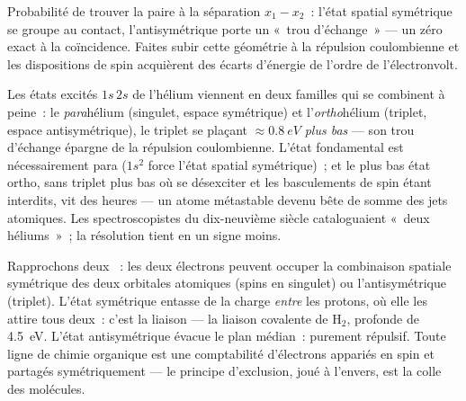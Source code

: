 \begin{omfigure}

{\small Probabilité de trouver la paire à la séparation $x_1 - x_2$~:
l'état spatial symétrique se groupe au contact, l'antisymétrique porte
un «~trou d'échange~» --- un zéro exact à la coïncidence. Faites
subir cette géométrie à la répulsion coulombienne et les dispositions
de spin acquièrent des écarts d'énergie de l'ordre de l'électronvolt.}
\end{omfigure}

\begin{example}\label{ex:b3:identical-particles:helium}
Les états excités $1s\,2s$ de l'hélium viennent en deux familles qui
se combinent à peine~: le \emph{para}hélium (singulet, espace
symétrique) et l'\emph{ortho}hélium (triplet, espace antisymétrique),
le triplet se plaçant $\approx\qty{0.8}{eV}$ \emph{plus bas} --- son
trou d'échange épargne de la répulsion coulombienne. L'état
fondamental est nécessairement para ($1s^2$ force l'état spatial
symétrique)~; et le plus bas état ortho, sans triplet plus bas où se
désexciter et les basculements de spin étant interdits, vit des
heures --- un atome métastable devenu bête de somme des jets
atomiques. Les spectroscopistes du dix-neuvième siècle cataloguaient
«~deux héliums~»~; la résolution tient en un signe moins.
\end{example}

\begin{example}\label{ex:b3:identical-particles:bond}
Rapprochons deux ~: les deux électrons peuvent
occuper la combinaison spatiale symétrique des deux orbitales
atomiques (spins en singulet) ou l'antisymétrique (triplet). L'état
symétrique entasse de la charge \emph{entre} les protons, où elle les
attire tous deux~: c'est la liaison --- la liaison covalente de
H$_2$, profonde de \qty{4.5}{eV}. L'état antisymétrique évacue le plan
médian~: purement répulsif. Toute ligne de chimie organique est une
comptabilité d'électrons appariés en spin et partagés symétriquement
--- le principe d'exclusion, joué à l'envers, est la colle des
molécules.
\end{example}

